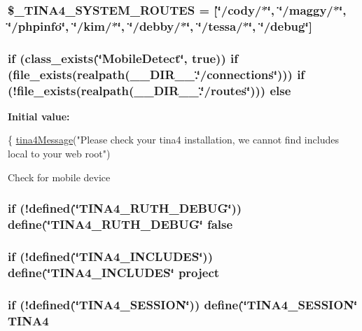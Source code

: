 \subsubsection[{\$\+\_\+\+T\+I\+N\+A4\+\_\+\+S\+Y\+S\+T\+E\+M\+\_\+\+R\+O\+U\+T\+E\+S}]{\setlength{\rightskip}{0pt plus 5cm}\$\+\_\+\+T\+I\+N\+A4\+\_\+\+S\+Y\+S\+T\+E\+M\+\_\+\+R\+O\+U\+T\+E\+S = \mbox{[}\char`\"{}/cody/$\ast$\char`\"{}, \char`\"{}/maggy/$\ast$\char`\"{}, \char`\"{}/phpinfo\char`\"{}, \char`\"{}/kim/$\ast$\char`\"{}, \char`\"{}/debby/$\ast$\char`\"{}, \char`\"{}/tessa/$\ast$\char`\"{}, \char`\"{}/debug\char`\"{}\mbox{]}}\label{tina4_8php_aee4930dce4a7a4e58ff1deb77c5efe06}
\hypertarget{tina4_8php_a350389f83aef240942d13c10eeecde80}{}
\subsubsection[{else}]{\setlength{\rightskip}{0pt plus 5cm}if (class\+\_\+exists(\char`\"{}Mobile\+Detect\char`\"{}, true)) if (file\+\_\+exists(realpath(\+\_\+\+\_\+\+D\+I\+R\+\_\+\+\_\+.\char`\"{}/connections\char`\"{}))) if (!file\+\_\+exists(realpath(\+\_\+\+\_\+\+D\+I\+R\+\_\+\+\_\+.\char`\"{}/routes\char`\"{}))) else}\label{tina4_8php_a350389f83aef240942d13c10eeecde80}
{\bfseries Initial value\+:}
\begin{DoxyCode}
\{
    \hyperlink{tina4_8php_a58ad3c7e6ce35bedc420e4ae8d031aa0}{tina4Message}(\textcolor{stringliteral}{"Please check your tina4 installation, we cannot find includes local to your
       web root"})
\end{DoxyCode}
Check for mobile device \hypertarget{tina4_8php_aec2deb5590a84bee262c3bea206ae88f}{}
\subsubsection[{false}]{\setlength{\rightskip}{0pt plus 5cm}if (!defined(\char`\"{}T\+I\+N\+A4\+\_\+\+R\+U\+T\+H\+\_\+\+D\+E\+B\+U\+G\char`\"{})) define(\char`\"{}T\+I\+N\+A4\+\_\+\+R\+U\+T\+H\+\_\+\+D\+E\+B\+U\+G\char`\"{} false}\label{tina4_8php_aec2deb5590a84bee262c3bea206ae88f}
\hypertarget{tina4_8php_af44e53807735b3a9307a735cbac46e03}{}
\subsubsection[{project}]{\setlength{\rightskip}{0pt plus 5cm}if (!defined(\char`\"{}T\+I\+N\+A4\+\_\+\+I\+N\+C\+L\+U\+D\+E\+S\char`\"{})) define(\char`\"{}T\+I\+N\+A4\+\_\+\+I\+N\+C\+L\+U\+D\+E\+S\char`\"{} project}\label{tina4_8php_af44e53807735b3a9307a735cbac46e03}
\hypertarget{tina4_8php_ad21384bf3005ff979361b5fb4054b763}{}
\subsubsection[{T\+I\+N\+A4}]{\setlength{\rightskip}{0pt plus 5cm}if (!defined(\char`\"{}T\+I\+N\+A4\+\_\+\+S\+E\+S\+S\+I\+O\+N\char`\"{})) define(\char`\"{}T\+I\+N\+A4\+\_\+\+S\+E\+S\+S\+I\+O\+N\char`\"{} T\+I\+N\+A4}\label{tina4_8php_ad21384bf3005ff979361b5fb4054b763}
